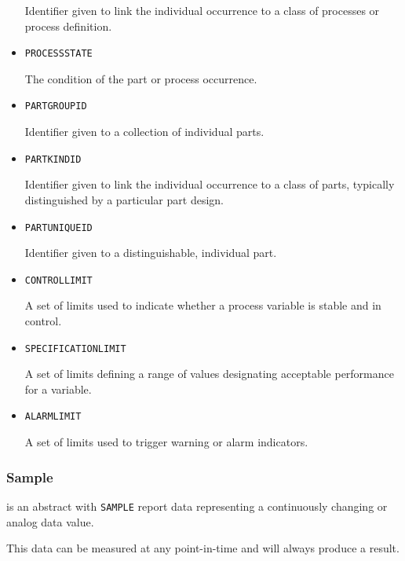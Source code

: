 \begin{itemize}
Identifier given to link the individual occurrence to a class of processes or process definition.



\item \texttt{PROCESS\textunderscore STATE}  

The condition of the part or process occurrence.


\item \texttt{PART\textunderscore GROUP\textunderscore ID}  

Identifier given to a collection of individual parts. 


\item \texttt{PART\textunderscore KIND\textunderscore ID}  

Identifier given to link the individual occurrence to a class of parts, typically distinguished by a particular part design.


\item \texttt{PART\textunderscore UNIQUE\textunderscore ID}  

Identifier given to a distinguishable, individual part. 


\item \texttt{CONTROL\textunderscore LIMIT}  

A set of limits used to indicate whether a process variable is stable and in control.


\item \texttt{SPECIFICATION\textunderscore LIMIT}  

A set of limits defining a range of values designating acceptable performance for a variable.


\item \texttt{ALARM\textunderscore LIMIT}  

A set of limits used to trigger warning or alarm indicators.

\end{itemize}



\subsubsection{Sample}
\label{sec:Sample}



 is an abstract  with \texttt{SAMPLE}  report data representing a continuously changing or analog data value.

This data can be measured at any point-in-time and will always produce a result.


